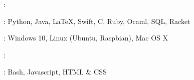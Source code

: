 \documentclass{resume}
\newif\ifen
\newif\ifzh
\newif\ifboth
\newcommand{\en}[1]{\ifen#1\fi}
\newcommand{\zh}[1]{\ifzh#1\fi}
\newcommand{\both}[1]{\ifboth#1\fi}
\begin{document}
    \section{\faCogs\ \en{Skills}\both{ }\zh{¼¼ÄÜ}}
    \begin{myitemize}
        \item \en{Languages}\both{ }\zh{ÓïÑÔ}: \en{English - Proficient, Chinese - Native}
        \item \en{Programming Languages}\both{ }\zh{±à³ÌÓïÑÔ}: Python, Java, \LaTeX, Swift, C, Ruby, Ocaml, SQL, Racket
        \item \en{Platform}\both{ }\zh{Æ½Ì¨}: Windows 10, Linux (Ubuntu, Raspbian), Mac OS X
        \item \en{Skills}\both{ }\zh{¼¼ÊõÕ»}: \en{Cryptography, Database Design, Data Visualization, Algorithm Design, Compiler, Computer Vision, iOS Programming, Network Security}
        \item \en{Others}\both{ }\zh{ÆäËû}: Bash, Javascript, HTML \& CSS
    \end{myitemize}


\end{document}

